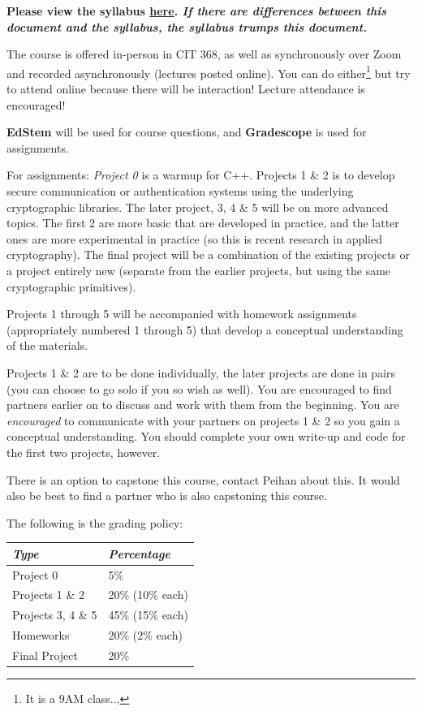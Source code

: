 \textbf{Please view the syllabus \href{https://docs.google.com/document/d/1SPlL17ee0XNtt4GF7FIcEp9pzA80lRHKfBE1bLBKImE/edit?usp=sharing}{here}. \emph{If there are differences between this document and the syllabus, the syllabus trumps this document.}}

The course is offered in-person in CIT 368, as well as synchronously over Zoom and recorded asynchronously (lectures posted online). You can do either\footnote{It is a 9AM class...} but try to attend online because there will be interaction! Lecture attendance is encouraged!

\textbf{EdStem} will be used for course questions, and \textbf{Gradescope} is used for assignments.

For assignments: \emph{Project 0} is a warmup for C++. Projects 1 \& 2 is to develop secure communication or authentication systems using the underlying cryptographic libraries. The later project, 3, 4 \& 5 will be on more advanced topics. The first 2 are more basic that are developed in practice, and the latter ones are more experimental in practice (so this is recent research in applied cryptography). The final project will be a combination of the existing projects or a project entirely new (separate from the earlier projects, but using the same cryptographic primitives).

Projects 1 through 5 will be accompanied with homework assignments (appropriately numbered 1 through 5) that develop a conceptual understanding of the materials.

Projects 1 \& 2 are to be done individually, the later projects are done in pairs (you can choose to go solo if you so wish as well). You are encouraged to find partners earlier on to discuss and work with them from the beginning. You are \emph{encouraged} to communicate with your partners on projects 1 \& 2 so you gain a conceptual understanding. You should complete your own write-up and code for the first two projects, however.

There is an option to capstone this course, contact Peihan about this. It would also be best to find a partner who is also capstoning this course.

The following is the grading policy:
\begin{center}
    \begin{tabular}{@{}ll@{}}
        \toprule
        \textit{Type}      & \textit{Percentage} \\ \midrule
        Project 0          & 5\%                 \\
        Projects 1 \& 2    & 20\% (10\% each)    \\
        Projects 3, 4 \& 5 & 45\% (15\% each)    \\
        Homeworks          & 20\% (2\% each)     \\
        Final Project      & 20\%                \\ \bottomrule
    \end{tabular}
\end{center}

